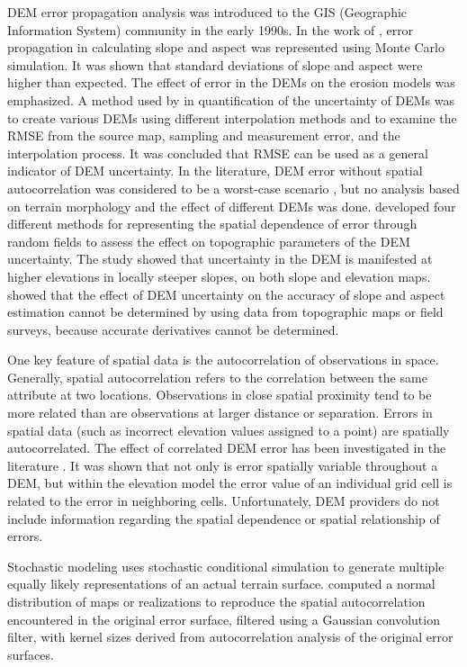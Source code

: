 \documentclass[12pt]{article}
\begin{document}
DEM error propagation analysis was introduced to the GIS 
(Geographic Information System) community in
the early 1990s.  In the work of \citet{Heuvelink1990}, error
propagation in calculating slope and aspect was represented using
Monte Carlo simulation. It was shown
that standard deviations of slope and aspect were higher than
expected.  The effect of error in the DEMs on the erosion models was
emphasized.  A method used by \citet{Qihao_Weng} in quantification of
the uncertainty of DEMs was to create various DEMs using different
interpolation methods and to examine the RMSE from the source map,
sampling and measurement error, and the interpolation process. It was
concluded that RMSE can be used as a general indicator of DEM
uncertainty.  In the literature, DEM error without spatial
autocorrelation was considered to be a worst-case scenario
\citep{Heuvelink1989, VanNiel2004, Oksanen2006}, but no analysis based
on terrain morphology and the effect of different DEMs was done.
\citet{Wechsler2006} developed four different methods for representing
the spatial dependence of error through random fields to assess the
effect on topographic parameters of the DEM uncertainty. The study
showed that uncertainty in the DEM is manifested at higher elevations
in locally steeper slopes, on both slope and elevation maps.
\citet{Florinsky1998} showed that the effect of DEM uncertainty on the
accuracy of slope and aspect estimation cannot be determined by using
data from topographic maps or field surveys, because accurate
derivatives cannot be determined.

One key feature of spatial data is the autocorrelation of observations
in space.  Generally, spatial autocorrelation refers to the
correlation between the same attribute at two locations. Observations
in close spatial proximity tend to be more related than are
observations at larger distance or separation. Errors in spatial data
(such as incorrect elevation values assigned to a point) are spatially
autocorrelated. The effect of correlated DEM error has been
investigated in the literature \citep{Fisher_1991, Goodchild_1992}. It
was shown that not only is error spatially variable throughout a DEM,
but within the elevation model the error value of an individual grid
cell is related to the error in neighboring cells. Unfortunately, DEM
providers do not include information regarding the spatial dependence
or spatial relationship of errors.

Stochastic modeling uses stochastic conditional simulation to generate
multiple equally likely representations of an actual terrain
surface. \citet{Ehlschlaeger_1996, Hunter_Goodchild_1997} computed a
normal distribution of maps or realizations to reproduce the spatial
autocorrelation encountered in the original error surface, filtered
using a Gaussian convolution filter, with kernel sizes derived from
autocorrelation analysis of the original error surfaces.
\end{document}
